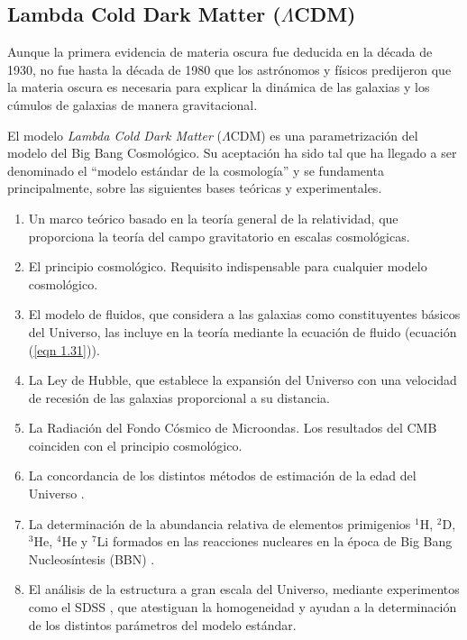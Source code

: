 \documentclass[a4paper,openright,10pt, oneside, final]{book}
\begin{document}



\subsection{Lambda Cold Dark Matter ($\Lambda$CDM)}
Aunque la primera evidencia de materia oscura fue deducida en la década de 1930, no fue hasta la década de 1980 que los astrónomos y físicos predijeron que la materia oscura es necesaria para explicar la dinámica de las galaxias y los cúmulos de galaxias de manera gravitacional.

El modelo \textit{Lambda Cold Dark Matter} ($\Lambda$CDM) es una parametrización del modelo del Big Bang Cosmológico. Su aceptación ha sido tal que ha llegado a ser denominado  el ``modelo estándar de la cosmología'' y se  fundamenta principalmente, sobre las siguientes bases teóricas y experimentales. 
\begin{enumerate}
\item Un marco teórico basado en la teoría general de la relatividad, que proporciona la teoría del campo gravitatorio en escalas cosmológicas.
\item El principio cosmológico. Requisito indispensable para cualquier modelo cosmológico.
\item El modelo de fluidos, que considera a las galaxias como constituyentes básicos del Universo, las incluye en la teoría mediante la ecuación de fluido (ecuación (\ref{eqn 1.31})).
\item La Ley de Hubble, que establece la expansión del Universo con una velocidad de recesión de las galaxias proporcional a su distancia.
\item La Radiación del Fondo Cósmico de Microondas. Los resultados del CMB coinciden con el principio cosmológico.
\item La concordancia de los distintos métodos de estimación de la edad del Universo \cite{1.1.5}. 
\item La determinación de la abundancia relativa de elementos primigenios $^{1}$H, $^{2}$D, $^{3}$He, $^{4}$He y $^{7}$Li formados en las reacciones nucleares en la época de Big Bang Nucleosíntesis (BBN) \cite{1.1.6, 1.1.7, 1.1.8}.
\item El análisis de la estructura a gran escala del Universo, mediante experimentos como el SDSS \cite{1.1.9}, que atestiguan la homogeneidad y ayudan a la determinación de los distintos parámetros del modelo estándar.

\end{enumerate}
\end{document}
